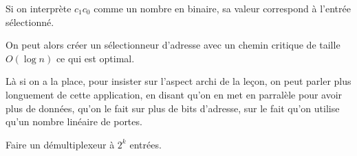\begin{rem}
	Si on interprète $c_1c_0$ comme un nombre en binaire, sa valeur correspond à l'entrée sélectionné.
\end{rem}

\begin{appl}
	On peut alors créer un sélectionneur d'adresse avec un chemin critique de taille $O(\log n)$ ce qui est optimal.
\end{appl}

\begin{com}
	Là si on a la place, pour insister sur l'aspect archi de la leçon, on peut parler plus longuement de cette application, en disant qu'on en met en parralèle pour avoir plus de données, qu'on le fait sur plus de bits d'adresse, sur le fait qu'on utilise qu'un nombre linéaire de portes.
\end{com}

\begin{exercise}
	Faire un démultiplexeur à $2^k$ entrées.
\end{exercise}











